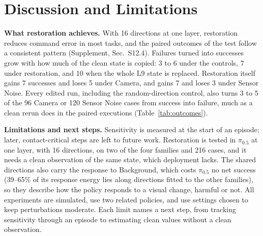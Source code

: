\section{Discussion and Limitations}
\label{sec:discussion}
\textbf{What restoration achieves.} With 16 directions at one layer, restoration reduces command error in most tasks, and the paired outcomes of the test follow a consistent pattern (Supplement, Sec.~S12.4). Failures turned into successes grow with how much of the clean state is copied: 3 to 6 under the controls, 7 under restoration, and 10 when the whole L9 state is replaced. Restoration itself gains 7 successes and loses 5 under Camera, and gains 7 and loses 3 under Sensor Noise. Every edited run, including the random-direction control, also turns 3 to 5 of the 96 Camera or 120 Sensor Noise cases from success into failure, much as a clean rerun does in the paired executions (Table~\ref{tab:outcomes}).

\textbf{Limitations and next steps.} Sensitivity is measured at the start of an episode; later, contact-critical steps are left to future work. Restoration is tested in $\pi_{0.5}$ at one layer, with 16 directions, on two of the four families and 216 cases, and it needs a clean observation of the same state, which deployment lacks. The shared directions also carry the response to Background, which costs $\pi_{0.5}$ no net success (39--65\% of its response energy lies along directions fitted to the other families), so they describe how the policy responds to a visual change, harmful or not. All experiments are simulated, use two related policies, and use settings chosen to keep perturbations moderate. Each limit names a next step, from tracking sensitivity through an episode to estimating clean values without a clean observation.
